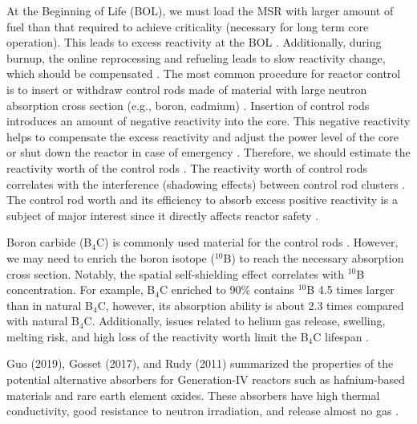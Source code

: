 At the Beginning of Life (BOL), we must load the MSR with larger amount of 
fuel than that required to achieve criticality (necessary for long term core 
operation). This leads to excess reactivity at the BOL 
\cite{duderstadt650nuclear}. Additionally, during burnup, the online 
reprocessing and refueling leads to slow reactivity change, which 
should be compensated \cite{ashraf2019whole_core}. The most common procedure 
for reactor control is to insert or withdraw control rods made of material 
with large neutron absorption cross section (e.g., boron, cadmium) 
\cite{duderstadt650nuclear}. 
Insertion of control rods introduces an amount of negative reactivity into the 
core. This negative reactivity helps to compensate the excess reactivity and 
adjust the power level of the core or shut down the reactor in case of  
emergency \cite{glasstone1967nuclear}. Therefore, we should estimate 
the reactivity worth of the control rods 
\cite{varvayanni2009estimation,fadaei2009control,aoyama2007core,bretscher1997computing}.
 The reactivity worth of control rods correlates with the interference 
(shadowing effects) between control rod clusters 
\cite{girardin2008development,vcerba2017optimization}. 
The control rod worth and its efficiency to absorb excess positive reactivity is a subject of major interest since it directly affects reactor safety \cite{liu2018criticality,atkinson2019small,vcerba2017optimization,do2019criticality,guo2019advanced,varvayanni2009estimation}.

Boron carbide (B$_4$C) is commonly used material for the control rods 
\cite{zhong2019preliminary,steinbruck2010degradation,dunner1984absorber}. 
However, we may need to enrich the boron isotope ($^{10}$B) to reach 
the necessary absorption cross section. Notably, the spatial self-shielding 
effect correlates with $^{10}$B concentration. For example, B$_4$C enriched to 
90\% contains $^{10}$B 4.5 times larger than in natural B$_4$C, however, its 
absorption ability is about 2.3 times compared with natural B$_4$C. 
Additionally, issues related to helium gas release, swelling, melting risk, 
and high loss of the reactivity worth limit the B$_4$C lifespan 
\cite{guo2019optimized}.

Guo (2019), Gosset (2017), and Rudy (2011) summarized the properties of the 
potential alternative absorbers for Generation-IV reactors such as 
hafnium-based materials and rare earth element oxides. These absorbers have 
high thermal conductivity, good resistance to neutron irradiation, and release 
almost no gas 
\cite{guo2019optimized,gosset2017absorber,konings2011comprehensive}.

